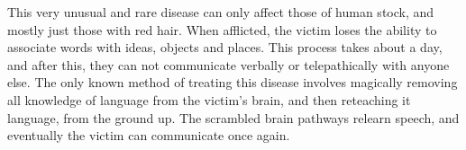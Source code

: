 \begin{multicols*}{2}
 This very unusual and rare disease can only affect those of human stock, and mostly just those with red hair. When afflicted, the victim loses the ability to associate words with ideas, objects and places. This process takes about a day, and after this, they can not communicate verbally or telepathically with anyone else. The only known method of treating this disease involves magically removing all knowledge of language from the victim's brain, and then reteaching it language, from the ground up. The scrambled brain pathways relearn speech, and eventually the victim can communicate once again.
\end{multicols*}